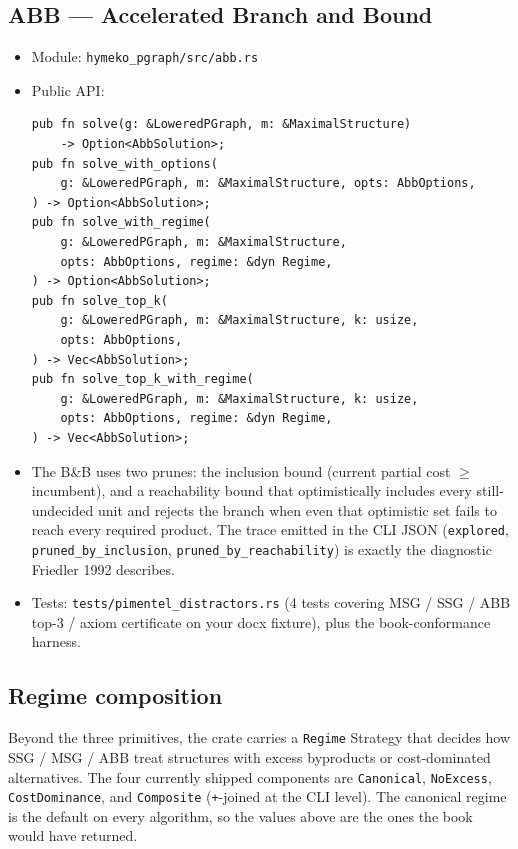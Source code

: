 \documentclass[11pt]{article}
\begin{document}
\subsection*{ABB --- Accelerated Branch and Bound}

\begin{itemize}[leftmargin=2em,itemsep=0pt]
  \item Module: \texttt{hymeko\_pgraph/src/abb.rs}
  \item Public API:
\begin{lstlisting}[style=ruststyle]
pub fn solve(g: &LoweredPGraph, m: &MaximalStructure)
    -> Option<AbbSolution>;
pub fn solve_with_options(
    g: &LoweredPGraph, m: &MaximalStructure, opts: AbbOptions,
) -> Option<AbbSolution>;
pub fn solve_with_regime(
    g: &LoweredPGraph, m: &MaximalStructure,
    opts: AbbOptions, regime: &dyn Regime,
) -> Option<AbbSolution>;
pub fn solve_top_k(
    g: &LoweredPGraph, m: &MaximalStructure, k: usize,
    opts: AbbOptions,
) -> Vec<AbbSolution>;
pub fn solve_top_k_with_regime(
    g: &LoweredPGraph, m: &MaximalStructure, k: usize,
    opts: AbbOptions, regime: &dyn Regime,
) -> Vec<AbbSolution>;
\end{lstlisting}
  \item The B\&B uses two prunes: the inclusion bound (current partial cost
        $\geq$ incumbent), and a reachability bound that optimistically includes
        every still-undecided unit and rejects the branch when even that
        optimistic set fails to reach every required product. The trace
        emitted in the CLI JSON (\texttt{explored}, \texttt{pruned\_by\_inclusion},
        \texttt{pruned\_by\_reachability}) is exactly the diagnostic Friedler 1992
        describes.
  \item Tests: \texttt{tests/pimentel\_distractors.rs} (4 tests covering MSG / SSG /
        ABB top-3 / axiom certificate on your docx fixture), plus the
        book-conformance harness.
\end{itemize}

\subsection*{Regime composition}

Beyond the three primitives, the crate carries a \texttt{Regime} Strategy
that decides how SSG / MSG / ABB treat structures with excess byproducts
or cost-dominated alternatives. The four currently shipped components
are \texttt{Canonical}, \texttt{NoExcess}, \texttt{CostDominance}, and \texttt{Composite}
(\texttt{+}-joined at the CLI level). The canonical regime is the default on
every algorithm, so the values above are the ones the book would have
returned.
\end{document}
